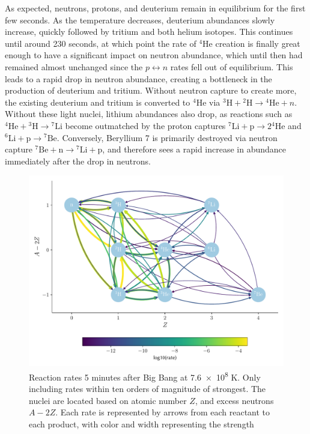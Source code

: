 As expected, neutrons, protons, and deuterium remain in equilibrium for the first few seconds. As the temperature decreases, deuterium abundances slowly increase, quickly followed by tritium and both helium isotopes. %
This continues until around 230 seconds, at which point the rate of ${}^4$He creation is finally great enough to have a significant impact on neutron abundance, which until then had remained almost unchanged since the $p\leftrightarrow n$ rates fell out of equilibrium. This leads to a rapid drop in neutron abundance, creating a bottleneck in the production of deuterium and tritium. Without neutron capture to create more, the existing deuterium and tritium is converted to ${}^4$He via ${}^3\text{H}+{}^2\text{H}\rightarrow {}^4\text{He}+n$. Without these light nuclei, lithium abundances also drop, as reactions such as ${}^4\text{He}+{}^3\text{H}\rightarrow {}^7\text{Li}$ become outmatched by the proton captures ${}^7\text{Li}+\text{p}\rightarrow 2{}^4\text{He}$ and ${}^6\text{Li}+\text{p}\rightarrow {}^7\text{Be}$. Conversely, Beryllium 7 is primarily destroyed via neutron capture ${}^7\text{Be}+\text{n}\rightarrow {}^7\text{Li}+\text{p}$, and therefore sees a rapid increase in abundance immediately after the drop in neutrons.
\begin{figure}[ht]
    \includegraphics[width=5.1in]{figures/smallnet5minutes.pdf}
    \caption{Reaction rates 5 minutes after Big Bang at \num{7.6e8} K. Only including rates within ten orders of magnitude of strongest. The nuclei are located based on atomic number $Z$, and excess neutrons $A-2Z$. Each rate is represented by arrows from each reactant to each product, with color and width representing the strength}
    \label{fig:5minutenet}
\end{figure}

